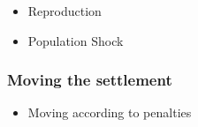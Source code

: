 \begin{itemize}
	\item Reproduction
	\item Population Shock
\end{itemize} 
 \subsubsection{Moving the settlement}
\begin{itemize}
	\item Moving according to penalties
\end{itemize}




